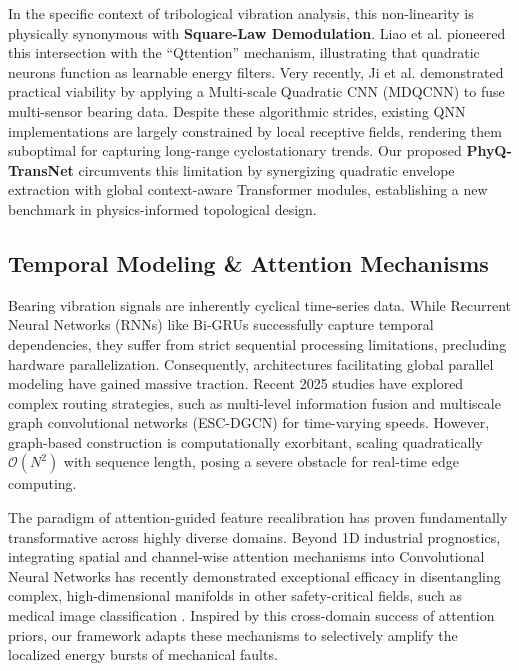 \documentclass[5p,times,twocolumn]{elsarticle}
\begin{document}
In the specific context of tribological vibration analysis, this non-linearity is physically synonymous with \textbf{Square-Law Demodulation}. Liao et al. \cite{P37_Liao, P13_Liao} pioneered this intersection with the ``Qttention'' mechanism, illustrating that quadratic neurons function as learnable energy filters. Very recently, Ji et al. \cite{Ref_Ji_MDQCNN} demonstrated practical viability by applying a Multi-scale Quadratic CNN (MDQCNN) to fuse multi-sensor bearing data. Despite these algorithmic strides, existing QNN implementations are largely constrained by local receptive fields, rendering them suboptimal for capturing long-range cyclostationary trends. Our proposed \textbf{PhyQ-TransNet} circumvents this limitation by synergizing quadratic envelope extraction with global context-aware Transformer modules, establishing a new benchmark in physics-informed topological design.

\subsection{Temporal Modeling \& Attention Mechanisms}
Bearing vibration signals are inherently cyclical time-series data. While Recurrent Neural Networks (RNNs) like Bi-GRUs \cite{P9_Yu, P17_Yin} successfully capture temporal dependencies, they suffer from strict sequential processing limitations, precluding hardware parallelization. Consequently, architectures facilitating global parallel modeling have gained massive traction. Recent 2025 studies have explored complex routing strategies, such as multi-level information fusion \cite{Ref_Wang_AEI_2025} and multiscale graph convolutional networks (ESC-DGCN) \cite{Ref_Li_ESC_DGCN} for time-varying speeds. However, graph-based construction is computationally exorbitant, scaling quadratically $\mathcal{O}(N^2)$ with sequence length, posing a severe obstacle for real-time edge computing. 

The paradigm of attention-guided feature recalibration has proven fundamentally transformative across highly diverse domains. Beyond 1D industrial prognostics, integrating spatial and channel-wise attention mechanisms into Convolutional Neural Networks has recently demonstrated exceptional efficacy in disentangling complex, high-dimensional manifolds in other safety-critical fields, such as medical image classification \cite{Ref_Naderi_BrainTumor_2025}. Inspired by this cross-domain success of attention priors, our framework adapts these mechanisms to selectively amplify the localized energy bursts of mechanical faults.
\end{document}
